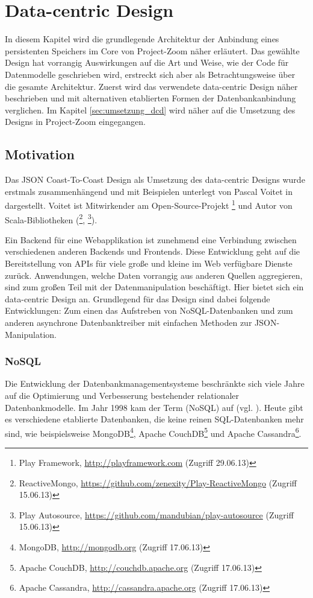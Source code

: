
\section{Data-centric Design}
\label{sec:dcd}
In diesem Kapitel wird die grundlegende Architektur der Anbindung eines persistenten Speichers im Core von Project-Zoom näher erläutert. Das gewählte Design hat vorrangig Auswirkungen auf die Art und Weise, wie der Code für Datenmodelle geschrieben wird, erstreckt sich aber als Betrachtungsweise über die gesamte Architektur. Zuerst wird das verwendete data-centric Design näher beschrieben und mit alternativen etablierten Formen der Datenbankanbindung verglichen. Im Kapitel \ref{sec:umsetzung_dcd} wird näher auf die Umsetzung des Designs in Project-Zoom eingegangen.

\subsection{Motivation}
\label{sec:dcdmotivation}
Das JSON Coast-To-Coast Design als Umsetzung des data-centric Designs wurde erstmals zusammenhängend und mit Beispielen unterlegt von Pascal Voitet in \cite{jctc} dargestellt. Voitet ist Mitwirkender am Open-Source-Projekt \footnote{Play Framework, \url{http://playframework.com} (Zugriff 29.06.13)} und Autor von Scala-Bibliotheken (\footnote{ReactiveMongo, \url{ https://github.com/zenexity/Play-ReactiveMongo} (Zugriff 15.06.13)}, \footnote{Play Autosource, \url{ https://github.com/mandubian/play-autosource} (Zugriff 15.06.13)}). 

Ein Backend für eine Webapplikation ist zunehmend eine Verbindung zwischen verschiedenen anderen Backends und Frontends. Diese Entwicklung geht auf die Bereitstellung von APIs für viele große und kleine im Web verfügbare Dienste zurück. Anwendungen, welche Daten vorrangig aus anderen Quellen aggregieren, sind zum großen Teil mit der Datenmanipulation beschäftigt. Hier bietet sich ein data-centric Design an. Grundlegend für das Design sind dabei folgende Entwicklungen: Zum einen das Aufstreben von NoSQL-Datenbanken und zum anderen asynchrone Datenbanktreiber mit einfachen Methoden zur JSON-Manipulation.

\subsubsection{NoSQL}
Die Entwicklung der Datenbankmanagementsysteme beschränkte sich viele Jahre auf die Optimierung und Verbesserung bestehender relationaler Datenbankmodelle. Im Jahr 1998 kam der Term  (NoSQL) auf (vgl. \cite{storage-solutions}). Heute gibt es verschiedene etablierte Datenbanken, die keine reinen SQL-Datenbanken mehr sind, wie beispielsweise MongoDB\footnote{MongoDB, \url{http://mongodb.org} (Zugriff 17.06.13)}, Apache CouchDB\footnote{Apache CouchDB, \url{http://couchdb.apache.org} (Zugriff 17.06.13)} und Apache Cassandra\footnote{Apache Cassandra, \url{http://cassandra.apache.org} (Zugriff 17.06.13)}.

